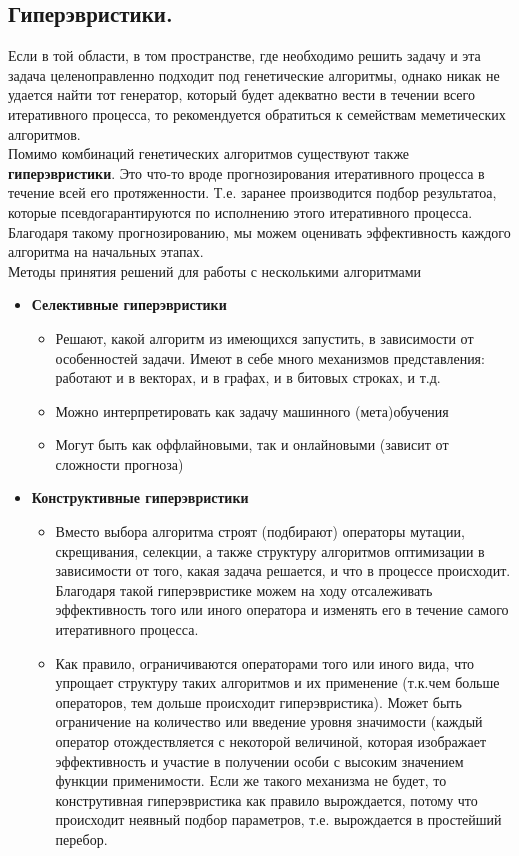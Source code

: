 \subsection*{Гиперэвристики.}
Если в той области, в том пространстве, где необходимо решить задачу и эта задача целеноправленно подходит под генетические алгоритмы, однако никак не удается найти тот генератор, который будет адекватно вести в течении всего итеративного процесса, то рекомендуется обратиться к семействам  меметических алгоритмов.\\
Помимо комбинаций генетических алгоритмов существуют также \textbf{гиперэвристики}. Это что-то вроде прогнозирования итеративного процесса в течение всей его протяженности. Т.е. заранее производится подбор результатоа, которые псевдогарантируются по исполнению этого итеративного процесса. Благодаря такому прогнозированию, мы можем оценивать эффективность каждого алгоритма на начальных этапах.\\
Методы принятия решений для работы с несколькими алгоритмами
\begin{itemize}
    \item \textbf{Селективные гиперэвристики}
    \begin{itemize}
        \item Решают, какой алгоритм из имеющихся запустить, в зависимости от особенностей задачи. Имеют в себе много механизмов  представления: работают и в векторах, и в графах, и в битовых строках, и т.д.
        \item Можно интерпретировать как задачу машинного (мета)обучения
        \item Могут быть как оффлайновыми, так и онлайновыми (зависит от сложности прогноза)
    \end{itemize}
    \item \textbf{Конструктивные гиперэвристики}
    \begin{itemize}
        \item Вместо выбора алгоритма строят (подбирают) операторы мутации, скрещивания, селекции, а также структуру алгоритмов оптимизации в зависимости от того, какая задача решается, и что в процессе происходит.\\
        Благодаря такой гиперэвристике можем на ходу отсалеживать эффективность того или иного оператора и изменять его в течение самого итеративного процесса.
        \item Как правило, ограничиваются операторами того или иного вида, что упрощает структуру таких алгоритмов и их применение (т.к.чем больше операторов, тем дольше происходит гиперэвристика). Может быть ограничение на количество или введение уровня значимости (каждый оператор отождествляется с некоторой величиной, которая изображает эффективность и участие в получении особи с высоким значением функции применимости. Если же такого механизма не будет, то конструтивная гиперэвристика как правило вырождается, потому что происходит неявный подбор параметров, т.е. вырождается в простейший перебор.
    \end{itemize}
\end{itemize}      

